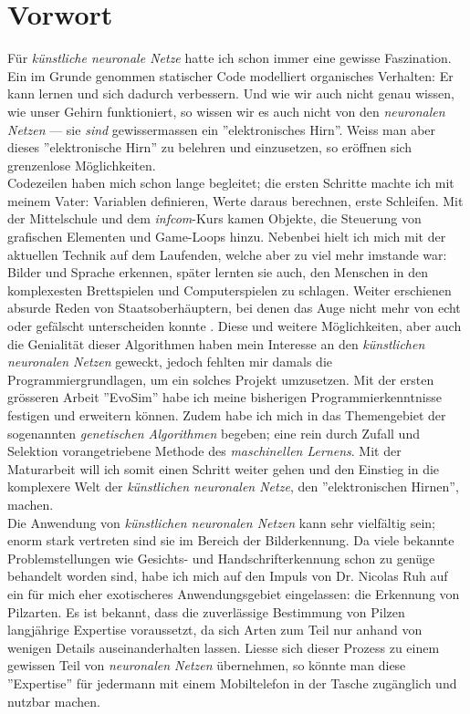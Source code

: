 \section*{Vorwort}
 Für \textit{künstliche neuronale Netze} hatte ich schon immer eine gewisse Faszination. Ein im Grunde genommen statischer Code modelliert organisches Verhalten: Er kann lernen und sich dadurch verbessern. Und wie wir auch nicht genau wissen, wie unser Gehirn funktioniert, so wissen wir es auch nicht von den \textit{neuronalen Netzen} --- sie \textit{sind} gewissermassen ein ''elektronisches Hirn''. Weiss man aber dieses ''elektronische Hirn'' zu belehren und einzusetzen, so eröffnen sich grenzenlose Möglichkeiten.\\
 
 Codezeilen haben mich schon lange begleitet; die ersten Schritte machte ich mit meinem Vater: Variablen definieren, Werte daraus berechnen, erste Schleifen. Mit der Mittelschule und dem \textit{infcom}-Kurs kamen Objekte, die Steuerung von grafischen Elementen und Game-Loops hinzu. Nebenbei hielt ich mich mit der aktuellen Technik auf dem Laufenden, welche aber zu viel mehr imstande war: Bilder und Sprache erkennen, später lernten sie auch, den Menschen in den komplexesten Brettspielen\cite{alphago} und Computerspielen\cite{openai} zu schlagen. Weiter erschienen absurde Reden von Staatsoberhäuptern, bei denen das Auge nicht mehr von echt oder gefälscht unterscheiden konnte \cite{deepfake}. Diese und weitere Möglichkeiten, aber auch die Genialität dieser Algorithmen haben mein Interesse an den \textit{künstlichen neuronalen Netzen} geweckt, jedoch fehlten mir damals die Programmiergrundlagen, um ein solches Projekt umzusetzen. Mit der ersten grösseren Arbeit ''EvoSim''\cite{evosim} habe ich meine bisherigen Programmierkenntnisse festigen und erweitern können. Zudem habe ich mich in das Themengebiet der sogenannten \textit{genetischen Algorithmen} begeben; eine rein durch Zufall und Selektion vorangetriebene Methode des \textit{maschinellen Lernens}. Mit der Maturarbeit will ich somit einen Schritt weiter gehen und den Einstieg in die komplexere Welt der \textit{künstlichen neuronalen Netze}, den ''elektronischen Hirnen'', machen.\\
 
 Die Anwendung von \textit{künstlichen neuronalen Netzen} kann sehr vielfältig sein; enorm stark vertreten sind sie im Bereich der Bilderkennung. Da viele bekannte Problemstellungen wie Gesichts- und Handschrifterkennung schon zu genüge behandelt worden sind, habe ich mich auf den Impuls von Dr. Nicolas Ruh auf ein für mich eher exotischeres Anwendungsgebiet eingelassen: die Erkennung von Pilzarten. Es ist bekannt, dass die zuverlässige Bestimmung von Pilzen langjährige Expertise voraussetzt, da sich Arten zum Teil nur anhand von wenigen Details auseinanderhalten lassen. Liesse sich dieser Prozess zu einem gewissen Teil von \textit{neuronalen Netzen} übernehmen, so könnte man diese ''Expertise'' für jedermann mit einem Mobiltelefon in der Tasche zugänglich und nutzbar machen.\\ 
 
